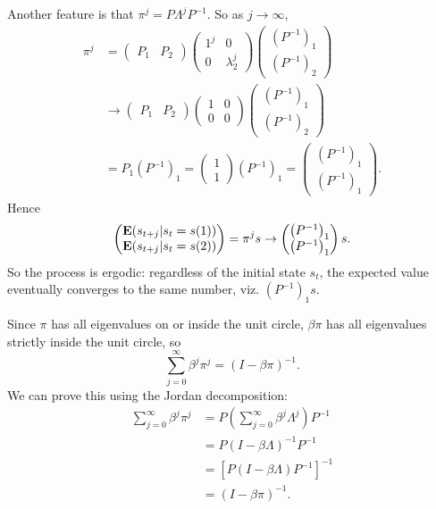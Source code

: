 \documentclass[11pt,letterpaper,reqno,oneside]{article}
\begin{document}
Another feature is that $\pi^j = P \Lambda^j P^{-1}$. So as $j\to\infty$, 
%
\begin{align*}
	\pi^j 
	&= 
	\begin{pmatrix}
		P_1 & P_2
	\end{pmatrix}
	\begin{pmatrix}
		1^j & 0 \\ 0 & \lambda_2^j
	\end{pmatrix}
	\begin{pmatrix}
		\left(P^{-1}\right)_1 \\ \left(P^{-1}\right)_2
	\end{pmatrix}
	\\
	&\to 
	\begin{pmatrix}
		P_1 & P_2
	\end{pmatrix}
	\begin{pmatrix}
		1 & 0 \\ 0 & 0
	\end{pmatrix}
	\begin{pmatrix}
		\left(P^{-1}\right)_1 \\ \left(P^{-1}\right)_2
	\end{pmatrix}
	\\
	&= 
	P_1 \left( P^{-1} \right)_1 
	= 
	\begin{pmatrix} 1 \\ 1 \end{pmatrix}
	\left( P^{-1} \right)_1 
	= 
	\begin{pmatrix}
		\left( P^{-1} \right)_1 \\
		\left( P^{-1} \right)_1 
	\end{pmatrix} .
\end{align*}
%
Hence
%
\begin{equation*}
	\begin{pmatrix}
	\mathbf{E}(s_{t+j}|s_t=s(1)) \\
	\mathbf{E}(s_{t+j}|s_t=s(2))
	\end{pmatrix}
	= \pi^j s 
	\to 
	\begin{pmatrix}
		\left( P^{-1} \right)_1 \\
		\left( P^{-1} \right)_1 
	\end{pmatrix} 
	s .
\end{equation*}
%
So the process is ergodic: regardless of the initial state $s_t$, the expected value eventually converges to the same number, viz. $\left( P^{-1} \right)_1 s$.

Since $\pi$ has all eigenvalues on or inside the unit circle, $\beta \pi$ has all eigenvalues strictly inside the unit circle, so
%
\begin{equation*}
	\sum_{j=0}^\infty \beta^j \pi^j = (I - \beta \pi)^{-1} .
\end{equation*}
%
We can prove this using the Jordan decomposition:
%
\begin{align*}
	\sum_{j=0}^\infty \beta^j \pi^j
	&= P \left( \sum_{j=0}^\infty \beta^j \Lambda^j \right) P^{-1}
	\\
	&= P \left( I - \beta \Lambda \right)^{-1} P^{-1}
	\\
	&= \left[ P \left( I - \beta \Lambda \right) P^{-1} \right]^{-1}
	\\
	&= \left( I - \beta \pi \right)^{-1} .
\end{align*}
\end{document}

